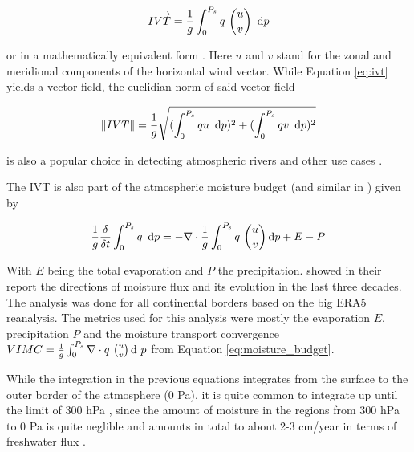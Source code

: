 \begin{equation}
\label{eq:ivt}  
\overrightarrow{IVT} = \frac{1}{g} \int^{P_s}_0 q ~\binom{u}{v} ~ \operatorname{d}\!{p}
\end{equation}

or in a mathematically equivalent form \cite{fernandez_analysis_2003}.
Here $u$ and $v$ stand for the zonal and meridional components of the horizontal wind vector. 
While Equation \ref{eq:ivt} yields a vector field, the euclidian norm of said vector field 

\begin{equation}
\label{eq:ivtnorm}
\lVert IVT \rVert = \frac{1}{g} \sqrt{(\int^{P_s}_0 qu ~ \operatorname{d}\!{p})^2 + (\int^{P_s}_0 qv ~ \operatorname{d}\!{p})^2}  
\end{equation}

is also a popular choice in detecting atmospheric rivers \cite{sousa_north_2020, ramos_atmospheric_2016} and other use cases \cite{ayantobo_integrated_2022}.



The IVT is also part of the atmospheric moisture budget \cite{yang_moisture_2022} (and similar in \cite{seager_mechanisms_2020}) given by 

$$
\label{eq:moisture_budget}
\frac{1}{g} \frac{\delta}{\delta t} \int^{P_s}_0 q ~ \operatorname{d}\!{p} = - \nabla \cdot \frac{1}{g} \int^{P_s}_0 q ~\binom{u}{v} \operatorname{d}\!{p} + E - P
$$

With $E$ being the total evaporation and $P$ the precipitation. 
\citeauthor{yang_moisture_2022} showed in their report \cite{yang_moisture_2022} the directions of moisture flux and its evolution in the last three decades. The analysis was done for all continental borders based on the big ERA5 reanalysis.
The metrics used for this analysis were mostly the evaporation $E$, precipitation $P$ and the moisture transport convergence  $VIMC = \frac{1}{g} \int^{P_s}_0  \nabla \cdot q ~\binom{u}{v} \operatorname{d}\!{~} p$ from Equation \ref{eq:moisture_budget}.

While the integration in the previous equations integrates from the surface to the outer border of the atmosphere (0 Pa), it is quite common to integrate up until the limit of 300 hPa \cite{ayantobo_integrated_2022, zhu_proposed_1998, kim_ensos_2015, guirguis_circulation_2018}, since the amount of moisture in the regions from 300 hPa to 0 Pa is quite neglible and amounts in total to about 2-3 cm/year in terms of freshwater flux \cite{zhou_atmospheric_2005}.

